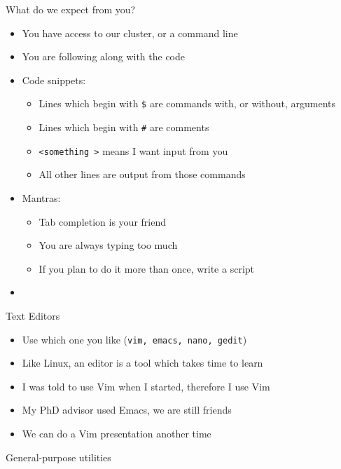 \documentclass[hyperref={pdfpagelabels=false},12pt]{beamer}
\newcommand{\myvbutton}[2]{\vfill\hyperlink{#1}{\beamerbutton{{#2}}}}
\begin{document}
\begin{frame}{What do we expect from you?}
    \begin{itemize}
        \item You have access to our cluster, or a command line
        \item You are following along with the code
        \item Code snippets:
        \begin{itemize}
            \item Lines which begin with \texttt{\$} are commands with, or without, arguments
            \item Lines which begin with \texttt{\#} are comments
            \item \texttt{\textless something \textgreater} means I want input from you
            \item All other lines are output from those commands
        \end{itemize}
        \item Mantras:
        \begin{itemize}
            \item Tab completion is your friend
            \item You are always typing too much
            \item If you plan to do it more than once, write a script
        \end{itemize}
        \item \color{red}{Type what you see, experiment!}
    \end{itemize}
\end{frame}

\begin{frame}{Text Editors}
    \begin{itemize}
        \item Use which one you like (\texttt{vim, emacs, nano, gedit}) 
        \item Like Linux, an editor is a tool which takes time to learn
        \item I was told to use Vim when I started, therefore I use Vim
        \item My PhD advisor used Emacs, we are still friends
        \item We can do a Vim presentation another time
    \end{itemize}
\end{frame}

\begin{frame}[label=general-1]{General-purpose utilities}
\inputminted[bgcolor=lightgray,linenos,fontsize=\footnotesize]{bash}{code/general-purpose-utilities-1.txt}
\myvbutton{exercises-1}{Exercises (1)}
\end{frame}
\end{document}
